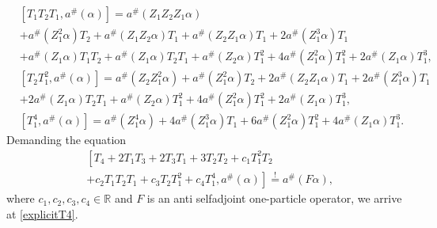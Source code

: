\documentclass[oneside,reqno,12pt]{amsart}
\begin{document}
\begin{align}\tag*{}
&\left[T_1 T_2 T_1, a^\#(\alpha)\right]= a^\#\left(Z_1 Z_2 Z_1 \alpha\right) \\
&+a^\#\left(Z_1^2 \alpha\right)T_2+ a^\#\left(Z_1 Z_2 \alpha\right)T_1
+ a^\#\left(Z_2 Z_1 \alpha\right)T_1
+2 a^\#\left(Z_1^3 \alpha\right)T_1\\\tag*{}
&+ a^\#\left(Z_1  \alpha\right)T_1T_2+ a^\#\left(Z_1  \alpha\right)T_2T_1
+ a^\#\left(Z_2 \alpha\right)T_1^2
+4 a^\#\left(Z_1^2 \alpha\right)T_1^2+ 2 a^\#\left(Z_1 \alpha\right)T_1^3
,\end{align}
\begin{align}\tag*{}
&\left[T_2T_1^2 , a^\#(\alpha)\right]= a^\#\left(Z_2Z_1^2  \alpha\right) 
+a^\#\left(Z_1^2 \alpha\right)T_2+2 a^\#\left(Z_2 Z_1 \alpha\right)T_1
+2 a^\#\left(Z_1^3 \alpha\right)T_1\\
&+2 a^\#\left(Z_1  \alpha\right)T_2T_1+ a^\#\left(Z_2 \alpha\right)T_1^2
+4 a^\#\left(Z_1^2 \alpha\right)T_1^2
+ 2 a^\#\left(Z_1 \alpha\right)T_1^3
,\end{align}
\begin{align}
&\left[T_1^4 , a^\#(\alpha)\right]= a^\#\left(Z_1^4  \alpha\right) 
+4 a^\#\left(Z_1^3 \alpha\right)T_1+6 a^\#\left( Z_1^2 \alpha\right)T_1^2
+4 a^\#\left(Z_1 \alpha\right)T_1^3
.\end{align}
Demanding the equation
\begin{align}\tag*{}
&\left[ T_4 + 2 T_1 T_3 + 2 T_3 T_1 + 3 T_2 T_2+ c_1 T_1^2 T_2 \right.\\
 &\left. + c_2 T_1T_2T_1+ c_3 T_2 T_1^2 + c_4 T_1^4,a^\#(\alpha)\right]\stackrel{!}{=} a^\#\left( F \alpha\right),
\end{align}
where \(c_1,c_2,c_3,c_4\in\mathbb{R}\) and \(F\) is an anti selfadjoint one-particle operator, we arrive at \eqref{explicitT4}.
\end{document}

